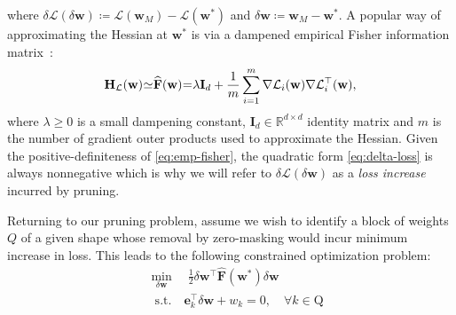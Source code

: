 \documentclass[11pt]{article}
\newcommand{\vect}[1]{\mathbf{#1}}
\newcommand{\wm}{\vect{w}_M}
\newcommand{\ws}{\vect{w}^*}
\newcommand{\w}{\mathbf{w}}
\newcommand{\hess}{\vect{H_{\mathcal{L}}}}
\newcommand{\dw}{\delta \w}
\newcommand{\dL}{\delta \mathcal{L}}
\newcommand{\eF}{\widehat{\vect{F}}}
\newcommand{\e}{\vect{e}}
\begin{document}
\noindent where \( \dL (\dw) \coloneqq \mathcal{L}(\wm) - \mathcal{L}(\ws) \) and \( \dw \coloneqq \wm - \ws \). 
A popular way of approximating the Hessian at $\ws$ is via a dampened  empirical Fisher information matrix~\cite{hassibi1993second}:
\begin{equation}
\label{eq:emp-fisher}
\noindent
    \hess(\w)\hspace*{-.25em} \simeq \hspace*{-.25em} \eF (\w) \hspace*{-.25em}=\hspace*{-.25em} \lambda \vect{I}_d + \frac{1}{m} \sum_{i=1}^{m} \nabla \mathcal{L}_i(\w) \nabla \mathcal{L}^\top_i(\w),
\end{equation}
\noindent where \( \lambda \geq 0 \) is a small dampening constant, \( \vect{I}_d \in \mathbb{R}^{d \times d} \) identity matrix and \( m \) is the number of gradient outer products used to approximate the Hessian. Given the positive-definiteness of \eqref{eq:emp-fisher}, the quadratic form \eqref{eq:delta-loss} is always nonnegative which is why we will refer to \( \dL(\dw) \) as a \textit{loss increase} incurred by pruning. 

Returning to our pruning problem, assume we wish to identify a block of weights $Q$ of a given shape whose removal by zero-masking would incur minimum increase in loss. This leads to the following constrained optimization problem: 
\begin{equation}
\label{eq:opt}
\begin{split}
    &\min_{\dw}\quad \frac{1}{2} \dw^\top \eF (\ws) \dw \\&\phantom{x}\mathrm{s.t.}\quad \e_k^\top \dw + w_k = 0, \quad \forall k \in \textrm{Q} 
\end{split}
\end{equation}
\end{document}
